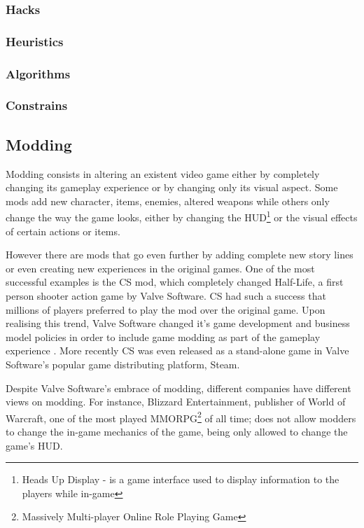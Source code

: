 \subsubsection{Hacks}
\subsubsection{Heuristics}
\subsubsection{Algorithms}
\subsubsection{Constrains}


\subsection{Modding}
Modding consists in altering an existent video game either by completely changing its gameplay experience or by changing only its visual aspect.
Some mods add new character, items, enemies, altered weapons while others only change the way the game looks, either by changing the \ac{HUD}\footnote{Heads Up Display - is a game interface used to display information to the players while in-game} or the visual effects of certain actions or items.

However there are mods that go even further by adding complete new story lines or even creating new experiences in the original games.
One of the most successful examples is the \ac{CS} mod, which completely changed Half-Life, a first person shooter action game by Valve Software.
\ac{CS} had such a success that millions of players preferred to play the mod over the original game.
Upon realising this trend, Valve Software changed it's game development and business model policies in order to include game modding as part of the gameplay experience \cite{scacchi:mods}.
More recently \ac{CS} was even released as a stand-alone game in Valve Software's popular game distributing platform, Steam.

Despite Valve Software's embrace of modding, different companies have different views on modding.
For instance, Blizzard Entertainment, publisher of World of Warcraft, one of the most played MMORPG\footnote{Massively Multi-player Online Role Playing Game} of all time; does not allow modders to change the in-game mechanics of the game, being only allowed to change the game's \ac{HUD}.

